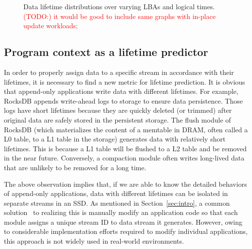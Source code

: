 \begin{figure}[t]
	\centering
	\vspace{-10pt}
	\caption{
		Data lifetime distributions over varying LBAs and logical times.
		\textcolor{red}{(TODO:) it would be good to include same graphs with
		in-place update workloads;}}
		\label{fig:lba_lifetime}
	\vspace{-15pt}
\end{figure}

\subsection{Program context as a lifetime predictor}

In order to properly assign data to a specific stream in accordance with their
lifetimes, it is necessary to find a new metric for lifetime prediction.  It is
obvious that append-only applications write data with different lifetimes.  For
example, RocksDB appends write-ahead logs to storage to ensure data
persistence.  Those logs have short lifetimes because they are quickly deleted
(or trimmed) after original data are safely stored in the persistent storage.
The flush module of RocksDB (which materializes the content of a memtable in
DRAM, often called a L0 table, to a L1 table in the storage) generates data
with relatively short lifetimes. This is because a L1 table will be flushed to
a L2 table and be removed in the near future. Conversely, a compaction module
often writes long-lived data that are unlikely to be removed for a long time.

The above observation implies that, if we are able to know the detailed
behaviors of append-only applications, data with different lifetimes can be
isolated in separate streams in an SSD. As mentioned in Section~\ref{sec:intro}, a
common solution~\cite{MultiStream} to realizing this is manually modify an
application code so that each module assigns a unique stream ID to data stream
it generates. However, owing to considerable implementation efforts
required to modify individual applications, this approach is not widely used in
real-world environments.

